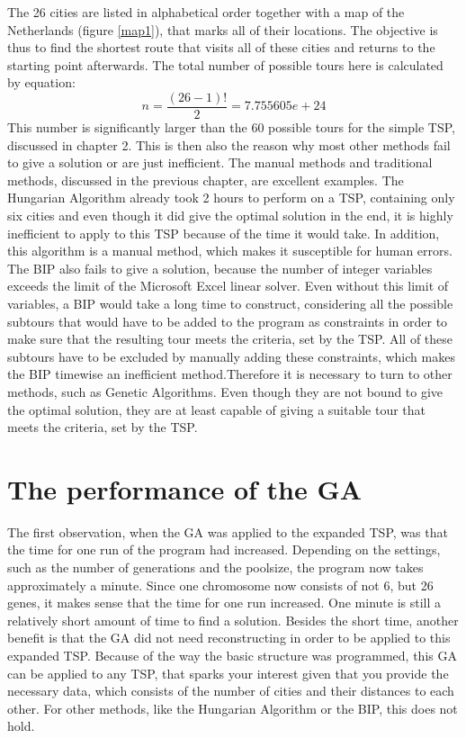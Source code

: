 \newpage
\par
The 26 cities are listed in alphabetical order together with a map of the Netherlands (figure \ref{map1}), that marks all of their locations. The objective is thus to find the shortest route that visits all of these cities and returns to the starting point afterwards. The total number of possible tours here is calculated by equation: %
\[n = \frac{(26-1)!}{2} =  7.755605e+24\]
This number is significantly larger than the 60 possible tours for the simple TSP, discussed in chapter 2. This is then also the reason why most other methods fail to give a solution or are just inefficient. The manual methods and traditional methods, discussed in the previous chapter, are excellent examples. The Hungarian Algorithm already took 2 hours to perform on a TSP, containing only six cities and even though it did give the optimal solution in the end, it is highly inefficient to apply to this TSP because of the time it would take. In addition, this algorithm is a manual method, which makes it susceptible for human errors. The BIP also fails to give a solution, because the number of integer variables exceeds the limit of the Microsoft Excel linear solver. Even without this limit of variables, a BIP would take a long time to construct, considering all the possible subtours that would have to be added to the program as constraints in order to make sure that the resulting tour meets the criteria, set by the TSP. All of these subtours have to be excluded by manually adding these constraints, which makes the BIP timewise an inefficient method.Therefore it is necessary to turn to other methods, such as Genetic Algorithms. Even though they are not bound to give the optimal solution, they are at least capable of giving a suitable tour that meets the criteria, set by the TSP.



\section{The performance of the GA} %
\par
The first observation, when the GA was applied to the expanded TSP, was that the time for one run of the program had increased. Depending on the settings, such as the number of generations and the poolsize, the program now takes approximately a minute. Since one chromosome now consists of not 6, but 26 genes, it makes sense that the time for one run increased. One minute is still a relatively short amount of time to find a solution. Besides the short time, another benefit is that the GA did not need reconstructing in order to be applied to this expanded TSP. Because of the way the basic structure was programmed, this GA can be applied to any TSP, that sparks your interest given that you provide the necessary data, which consists of the number of cities and their distances to each other. For other methods, like the Hungarian Algorithm or the BIP, this does not hold. 

